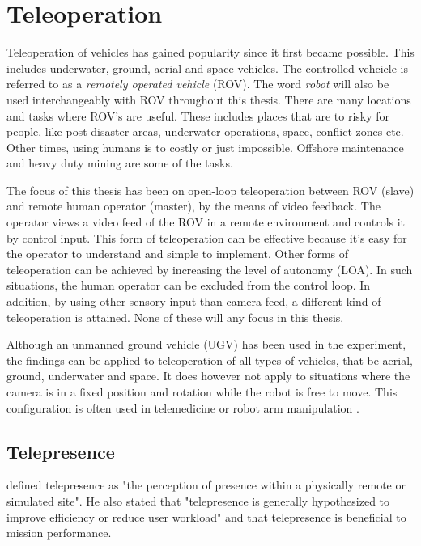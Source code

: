 \section{Teleoperation}

Teleoperation of vehicles has gained popularity since it first became possible. This includes underwater, ground, aerial and space vehicles. The controlled vehcicle is referred to as a \emph{remotely operated vehicle} (ROV). The word \emph{robot} will also be used interchangeably with ROV throughout this thesis. There are many locations and tasks where ROV's are useful. These includes places that are to risky for people, like post disaster areas, underwater operations, space, conflict zones etc. Other times, using humans is to costly or just impossible. Offshore maintenance and heavy duty mining are some of the tasks. 

The focus of this thesis has been on open-loop teleoperation between ROV (slave) and remote human operator (master), by the means of video feedback. The operator views a video feed of the ROV in a remote environment and controls it by control input. This form of teleoperation can be effective because it's easy for the operator to understand and simple to implement. Other forms of teleoperation can be achieved by increasing the level of autonomy (LOA). In such situations, the human operator can be excluded from the control loop. In addition, by using other sensory input than camera feed, a different kind of teleoperation is attained. None of these will any focus in this thesis.

Although an unmanned ground vehicle (UGV) has been used in the experiment, the findings can be applied to teleoperation of all types of vehicles, that be aerial, ground, underwater and space. It does however not apply to situations where the camera is in a fixed position and rotation while the robot is free to move. This configuration is often used in telemedicine \citep{Kumcu2017} or robot arm manipulation \citep{Bejczy1990}.

\subsection{Telepresence}

\citet{Draper1998} defined telepresence as "the perception of presence within a physically remote or simulated site". He also stated that "telepresence is generally hypothesized to improve efficiency or reduce user workload" and that telepresence is beneficial to mission performance.

